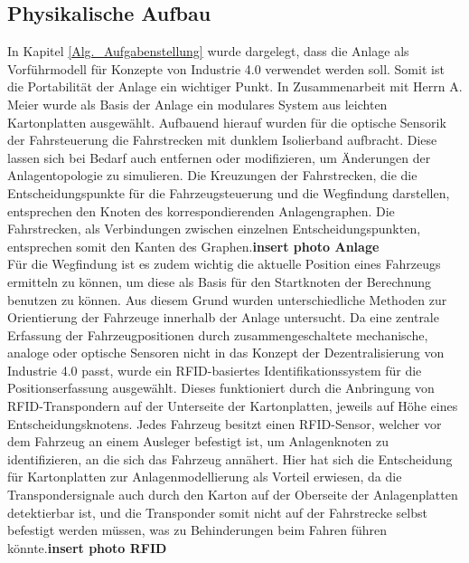 		\subsection{Physikalische Aufbau}
			\label{Phys_Anlage}
			In Kapitel \ref{Alg._Aufgabenstellung} wurde dargelegt, dass die Anlage als Vorführmodell für Konzepte von Industrie 4.0  verwendet werden soll. Somit ist die Portabilität der Anlage ein wichtiger Punkt. In Zusammenarbeit mit Herrn A. Meier wurde als Basis der Anlage ein modulares System aus leichten Kartonplatten ausgewählt. Aufbauend hierauf wurden für die optische Sensorik der Fahrsteuerung die Fahrstrecken mit dunklem Isolierband aufbracht. Diese lassen sich bei Bedarf auch entfernen oder modifizieren, um Änderungen der Anlagentopologie zu simulieren. Die Kreuzungen der Fahrstrecken, die die Entscheidungspunkte für die Fahrzeugsteuerung und die Wegfindung darstellen, entsprechen den Knoten des korrespondierenden Anlagengraphen. Die Fahrstrecken, als Verbindungen zwischen einzelnen Entscheidungspunkten, entsprechen somit den Kanten des Graphen.\textbf{insert photo Anlage}
			\\
			Für die Wegfindung ist es zudem wichtig die aktuelle Position eines Fahrzeugs ermitteln zu können, um diese als Basis für den Startknoten der Berechnung benutzen zu können. Aus diesem Grund wurden unterschiedliche Methoden zur Orientierung der Fahrzeuge innerhalb der Anlage untersucht. Da eine zentrale Erfassung der Fahrzeugpositionen durch zusammengeschaltete mechanische, analoge oder optische Sensoren nicht in das Konzept der Dezentralisierung von Industrie 4.0 passt, wurde ein \ac{RFID}-basiertes Identifikationssystem für die Positionserfassung ausgewählt. Dieses funktioniert durch die Anbringung von \ac{RFID}-Transpondern auf der Unterseite der Kartonplatten, jeweils auf Höhe eines Entscheidungsknotens. Jedes Fahrzeug besitzt einen \ac{RFID}-Sensor, welcher vor dem Fahrzeug an einem Ausleger befestigt ist, um Anlagenknoten zu identifizieren, an die sich das Fahrzeug annähert. Hier hat sich die Entscheidung für Kartonplatten zur Anlagenmodellierung als Vorteil erwiesen, da die Transpondersignale auch durch den Karton auf der Oberseite der Anlagenplatten detektierbar ist, und die Transponder somit nicht auf der Fahrstrecke selbst befestigt werden müssen, was zu Behinderungen beim Fahren führen könnte.\textbf{insert photo RFID}
			
